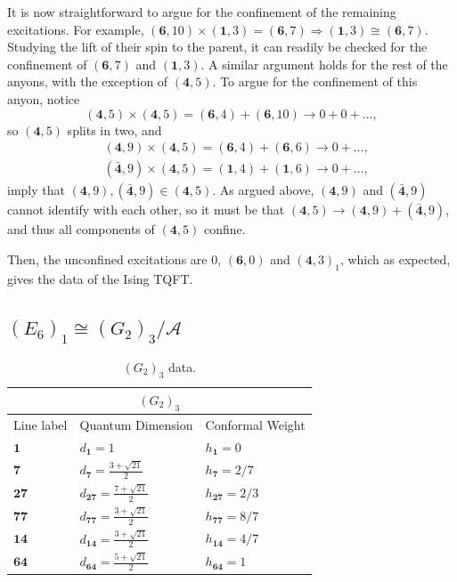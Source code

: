 \documentclass[11pt]{article}
\numberwithin{equation}{section}
\begin{document}
It is now straightforward to argue for the confinement of the remaining excitations. For example, $(\mathbf{6},10) \times (\mathbf{1},3) = (\mathbf{6},7) \Longrightarrow (\mathbf{1},3) \cong (\mathbf{6},7)$. Studying the lift of their spin to the parent, it can readily be checked for the confinement of $(\mathbf{6},7)$ and $(\mathbf{1},3)$. A similar argument holds for the rest of the anyons, with the exception of $(\mathbf{4},5)$. To argue for the confinement of this anyon, notice
\begin{equation}
    (\mathbf{4},5) \times (\mathbf{4},5) = (\mathbf{6},4) +  (\mathbf{6},10) \longrightarrow 0 + 0 + \ldots, 
\end{equation}
so $(\mathbf{4},5)$ splits in two, and
\begin{align}
    & (\mathbf{4},9) \times (\mathbf{4},5) = (\mathbf{6},4) + (\mathbf{6},6) \longrightarrow 0 + \ldots, \\[0.3cm]
    & (\mathbf{\bar{4}},9) \times (\mathbf{4},5) = (\mathbf{1},4) + (\mathbf{1},6) \longrightarrow 0 + \ldots, 
\end{align}
imply that $(\mathbf{4},9), (\mathbf{\bar{4}},9) \in (\mathbf{4},5)$. As argued above, $(\mathbf{4},9)$ and $(\mathbf{\bar{4}},9)$ cannot identify with each other, so it must be that $(\mathbf{4},5) \longrightarrow (\mathbf{4},9) + (\mathbf{\bar{4}},9)$, and thus all components of $(\mathbf{4},5)$ confine.

Then, the unconfined excitations are $0$, $(\mathbf{6},0)$ and $(\mathbf{4},3)_{1}$, which as expected, gives the data of the Ising TQFT.

\subsection{$(E_{6})_{1} \cong (G_{2})_{3}/\mathcal{A}$} \label{E61fromG23}

\begin{table}[t]
\centering
\begin{tabular}[h]{|p{4cm}|p{4cm}|p{4cm}| }
\hline 
\multicolumn{3}{|c|}{$(G_{2})_{3}$} \\
\hline
Line label & Quantum Dimension & Conformal Weight  \\
\hline
$\mathbf{1}$ & $d_{\mathbf{1}} = 1$ & $h_{\mathbf{1}}=0$ \\
$\mathbf{7}$ & $d_{\mathbf{7}} = \frac{3+\sqrt{21}}{2}$ & $h_{\mathbf{7}}=2/7$ \\
$\mathbf{27}$ & $d_{\mathbf{27}} = \frac{7+\sqrt{21}}{2}$ & $h_{\mathbf{27}}=2/3$ \\
$\mathbf{77}$ & $d_{\mathbf{77}} = \frac{3+\sqrt{21}}{2}$ & $h_{\mathbf{77}}=8/7$ \\
$\mathbf{14}$ & $d_{\mathbf{14}} = \frac{3+\sqrt{21}}{2}$ & $h_{\mathbf{14}}=4/7$ \\
$\mathbf{64}$ & $d_{\mathbf{64}} = \frac{5+\sqrt{21}}{2}$ & $h_{\mathbf{64}}=1$ \\
\hline
\end{tabular}
\caption{$(G_{2})_{3}$ data.}  \label{G2lv3table}
\end{table}
\end{document}
